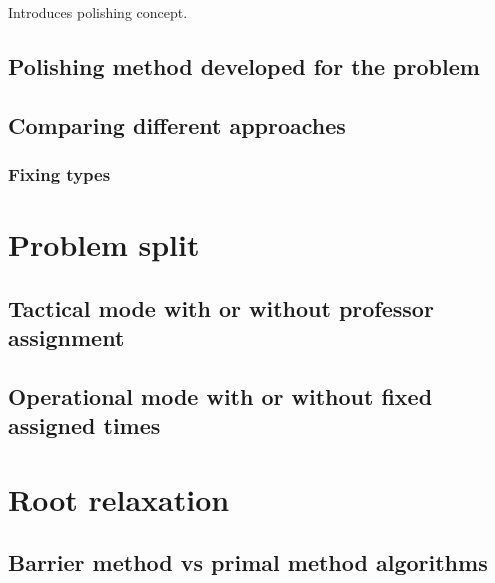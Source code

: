 Introduces polishing concept.

\subsection{Polishing method developed for the problem}

\subsection{Comparing different approaches}

\subsubsection{Fixing types}




\section{Problem split}

\subsection{Tactical mode with or without professor assignment}

\subsection{Operational mode with or without fixed assigned times}




\section{Root relaxation}

\subsection{Barrier method vs primal method algorithms}




